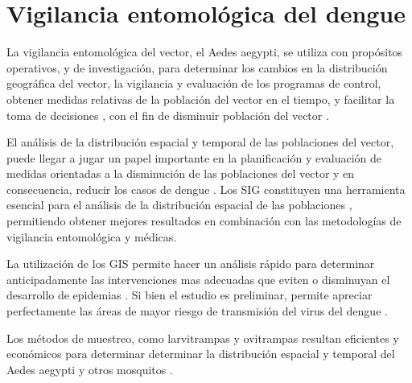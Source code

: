 \section{Vigilancia entomológica del dengue}
\label{sec:gis-vigilancia-entomologica-dengue}
La vigilancia entomológica del vector, el Aedes aegypti, se utiliza con propósitos operativos, y de
investigación, para determinar los cambios en la distribución geográfica del vector, la vigilancia
y evaluación de los programas de control, obtener medidas relativas de la población del vector en
el tiempo, y facilitar la toma de decisiones \cite{world2009dengue}, con el fin de disminuir
población del vector \cite{world2009dengue,dengueUruguayCap1, cenaprece2013,NINO2011}.

El análisis de la distribución espacial y temporal de las poblaciones del vector, puede llegar a
jugar un papel importante en la planificación y evaluación de medidas orientadas a la disminución
de las poblaciones del vector y en consecuencia, reducir los casos de dengue
\cite{world2009dengue,dengueUruguayCap1, cenaprece2013,nino2008uso}. Los SIG constituyen una
herramienta esencial para el análisis de la distribución espacial de las poblaciones
\cite{vgomesAegis2001,petric2012surveillance}, permitiendo obtener mejores resultados en
combinación con las metodologías de vigilancia entomológica y médicas\cite{petric2012surveillance}.

La utilización de los GIS permite hacer un análisis rápido para determinar anticipadamente las
intervenciones mas adecuadas que eviten o disminuyan el desarrollo de
epidemias \cite{bottinelli2002estratificacion}. Si bien el estudio es preliminar, permite
apreciar perfectamente las áreas de mayor riesgo de transmisión del virus del dengue
\cite{bottinelli2002estratificacion, NINO2011}.

Los métodos de muestreo, como larvitrampas y ovitrampas resultan eficientes y económicos para
determinar determinar la distribución espacial y temporal del Aedes aegypti y otros mosquitos
\cite{dengueUruguayCap1, cenaprece2013}.


